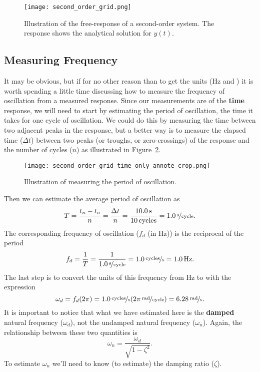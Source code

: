 \begin{figure}[h!bt]
\centerline{
{\texttt{[image: second\_order\_grid.png]}}}
\caption{Illustration of the free-response of a second-order system.  The response shows the analytical solution for $y(t)$.}
\label{f:secondfreeresp}
\end{figure}

\subsection{Measuring Frequency}
It may be obvious, but if for no other reason than to get the units (\unit[]{Hz} and ) it is worth spending a little time discussing how to measure the frequency of oscillation from a measured response.  Since our measurements are of the {\bf time} response, we will need to start by estimating the period of oscillation, the time it takes for one cycle of oscillation.  We could do this by measuring the time between two adjacent peaks in the response, but a better way is to measure the elapsed time ($\Delta t$) between two peaks (or troughs, or zero-crossings) of the response and the number of cycles ($n$) as illustrated in Figure~\ref{f:secondtime}.
\begin{figure}[h!bt]
\centerline{
{\texttt{[image: second\_order\_grid\_time\_only\_annote\_crop.png]}}}
\caption{Illustration of measuring the period of oscillation.}
\label{f:secondtime}
\end{figure}
Then we can estimate the average period of oscillation as
\begin{equation}
T = \frac{t_n-t_o}{n}=\frac{\Delta t}{n}=\frac{\unit[10.0]{s}}{\unit[10]{cycles}} = \unitfrac[1.0]{s}{cycle}.
\end{equation}
The corresponding frequency of oscillation ($f_d$ (in Hz)) is the reciprocal of the period
\begin{equation}
f_d = \frac{1}{T} = \frac{1}{\unitfrac[1.0]{s}{cycle}} = \unitfrac[1.0]{cycles}{s} = \unit[1.0]{Hz}.
\end{equation}
The last step is to convert the units of this frequency from Hz to  with the expression
\begin{equation}
\omega_d = f_d (2 \pi) = \unitfrac[1.0]{cycles}{s} (\unitfrac[2 \pi]{rad}{cycle}) = \unitfrac[6.28]{rad}{s}.
\end{equation}
It is important to notice that what we have estimated here is the {\bf damped} natural frequency ($\omega_d$), not the undamped natural frequency ($\omega_n$).  Again, the relationship between these two quantities is
\begin{equation}
\omega_n = \frac{\omega_d}{\sqrt{1-\zeta^2}}.
\end{equation}
To estimate $\omega_n$ we'll need to know (to estimate) the damping ratio ($\zeta$).

